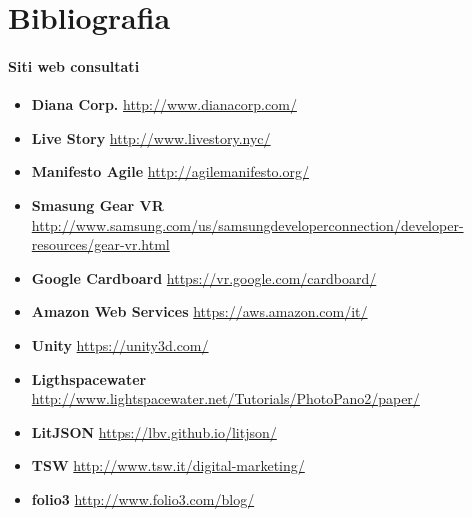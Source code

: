 \newpage

\cleardoublepage
\appendix


\chapter{Bibliografia}

\subsubsection{Siti web consultati}

\begin{itemize}
	\item \textbf{Diana Corp.}	\url{http://www.dianacorp.com/}
	\item \textbf{Live Story}	\url{http://www.livestory.nyc/}
	\item \textbf{Manifesto Agile}	\url{http://agilemanifesto.org/}
	\item \textbf{Smasung Gear VR}	\url{http://www.samsung.com/us/samsungdeveloperconnection/developer-resources/gear-vr.html}
	\item \textbf{Google Cardboard}	\url{https://vr.google.com/cardboard/}
	\item \textbf{Amazon Web Services}	\url{https://aws.amazon.com/it/}
	\item \textbf{Unity}	\url{https://unity3d.com/}
	\item \textbf{Ligthspacewater}	\url{http://www.lightspacewater.net/Tutorials/PhotoPano2/paper/}
	\item \textbf{LitJSON}	\url{https://lbv.github.io/litjson/}
	\item \textbf{TSW}	\url{http://www.tsw.it/digital-marketing/}
	\item \textbf{folio3}	\url{http://www.folio3.com/blog/}
\end{itemize}